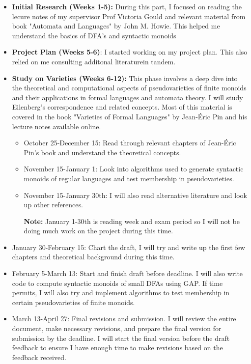 \begin{itemize}
	\item \textbf{Initial Research (Weeks 1-5):}  During this part, I focused on reading the lecure notes of my supervisor Prof Victoria Gould and relevant material from book "Automata and Languages" by John M. Howie. This helped me understand the basics of DFA's and syntactic monoids
	\item \textbf{Project Plan (Weeks 5-6)}: I started working on my project plan. This also relied on me consulting additonal literaturein tandem.
	\item \textbf{Study on Varieties (Weeks 6-12):} This phase involves a deep dive into the theoretical and computational aspects of pseudovarieties of finite monoids and their applications in formal languages and automata theory. I will study Eilenberg's correspondence and related concepts. Most of this material is covered in the book "Varieties of Formal Languages" by Jean-Éric Pin and his lecture notes available online.
	\begin{itemize}
		\item October 25-December 15: Read through relevant chapters of Jean-Éric Pin's book and understand the theoretical concepts.
		\item November 15-January 1: Look into algorithms used to generate syntactic monoids of regular languages and test membership in pseudovarieties.
		\item November 15-January 30th: I will also read alternative literature and look up other references.
		
		\textbf{Note:} January 1-30th is reading week and exam period so I will not be doing much work on the project during this time.
	\end{itemize}
	\item January 30-February 15: Chart the draft, I will try and write up the first few chapters and theoretical background during this time.
		\item February 5-March 13: Start and finish draft before deadline. I will also write code to compute syntactic monoids of small DFAs using GAP. If time permits, I will also try and implement algorithms to test membership in certain pseudovarieties of finite monoids.
		\item March 13-April 27: Final revisions and submission. I will review the entire document, make necessary revisions, and prepare the final version for submission by the deadline. I will start the final version before the draft feedback to ensure I have enough time to make revisions based on the feedback received.
\end{itemize}